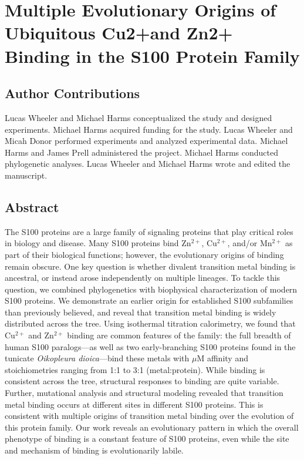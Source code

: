 \chapter{Multiple Evolutionary Origins of Ubiquitous Cu2+\newline and Zn2+ Binding in the S100 Protein Family}


\section{Author Contributions}
Lucas Wheeler and Michael Harms conceptualized the study and designed experiments. Michael Harms acquired funding for the study. Lucas Wheeler and Micah Donor performed experiments and analyzed experimental data. Michael Harms and James Prell administered the project. Michael Harms conducted phylogenetic analyses. Lucas Wheeler and Michael Harms wrote and edited the manuscript.

\section{Abstract}

The S100 proteins are a large family of signaling proteins that play critical roles in biology and disease. Many S100 proteins bind Zn$^{2+}$, Cu$^{2+}$, and/or Mn$^{2+}$ as part of their biological functions; however, the evolutionary origins of binding remain obscure. One key question is whether divalent transition metal binding is ancestral, or instead arose independently on multiple lineages. To tackle this question, we combined phylogenetics with biophysical characterization of modern S100 proteins. We demonstrate an earlier origin for established S100 subfamilies than previously believed, and reveal that transition metal binding is widely distributed across the tree. Using isothermal titration calorimetry, we found that Cu$^{2+}$ and Zn$^{2+}$ binding are common features of the family: the full breadth of human S100 paralogs---as well as two early-branching S100 proteins found in the tunicate \textit{Oikopleura dioica}---bind these metals with $\mu$M affinity and stoichiometries ranging from 1:1 to 3:1 (metal:protein). While binding is consistent across the tree, structural responses to binding are quite variable. Further, mutational analysis and structural modeling revealed that transition metal binding occurs at different sites in different S100 proteins. This is consistent with multiple origins of transition metal binding over the evolution of this protein family. Our work reveals an evolutionary pattern in which the overall phenotype of binding is a constant feature of S100 proteins, even while the site and mechanism of binding is evolutionarily labile.

